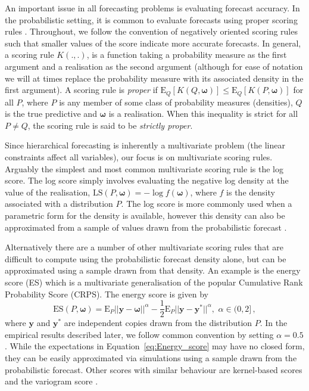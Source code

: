 \documentclass[11pt]{article}
\def\E{\text{E}}
\theoremstyle{definition}
\begin{document}
An important issue in all forecasting problems is evaluating forecast accuracy. In the probabilistic setting, it is common to evaluate forecasts using proper scoring rules \citep[see][and references therein]{Gneiting2007,Gneiting2014}. Throughout, we follow the convention of negatively oriented scoring rules such that smaller values of the score indicate more accurate forecasts. In general, a scoring rule $K(.,.)$, is a function taking a probability measure as the first argument and a realisation as the second argument (although for ease of notation we will at times replace the probability measure with its associated density in the first argument). A scoring rule is \emph{proper} if $\E_{Q}[K(Q,\bm{\omega})] \le \E_{Q}[K(P,{\bm\omega})]$ for all $P$, where $P$ is any member of some class of probability measures (densities), $Q$ is the true predictive and $\bm{\omega}$ is a realisation. When this inequality is strict for all $P\neq Q$, the scoring rule is said to be \emph{strictly proper}.

Since hierarchical forecasting is inherently a multivariate problem (the linear constraints affect all variables), our focus is on multivariate scoring rules. Arguably the simplest and most common multivariate scoring rule is the log score. The log score simply involves evaluating the negative log density at the value of the realisation, $\text{LS}(P,\bm\omega)=-\log f(\bm\omega)$, where $f$ is the density associated with a distribution $P$. The log score is more commonly used when a parametric form for the density is available, however this density can also be approximated from a sample of values drawn from the probabilistic forecast \citep[see][]{Jordan2017}.

Alternatively there are a number of other multivariate scoring rules that are difficult to compute using the probabilistic forecast density alone, but can be approximated using a sample drawn from that density. An example is the energy score (ES) \citep[see][for details]{szekely2003,Gneiting2007} which is a multivariate generalisation of the popular Cumulative Rank Probability Score (CRPS). The energy score is given by
\begin{equation}\label{eq:Energy_score}
\text{ES}(P,\bm{\omega}) =
\E_{P}
||{\bm{y}}-\bm{\omega}||^\alpha -\frac{1}{2}\E_{P}||\bm{y}-\bm{y}^*||^\alpha, \,\, \alpha \in (0,2]\,,
\end{equation}
where $\bm{y}$ and $\bm{y}^*$ are independent copies drawn from the distribution $P$. In the empirical results described later, we follow common convention by setting $\alpha=0.5$. While the expectations in Equation~\eqref{eq:Energy_score} may have no closed form, they can be easily approximated via simulations using a sample drawn from the probabilistic forecast. Other scores with similar behaviour are kernel-based scores \citep{dawid2007,Gneiting2007} and the variogram score \citep{SCHEUERER2015}.
\end{document}
